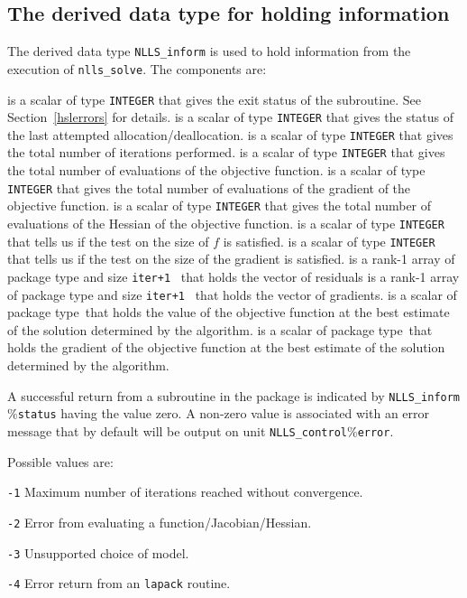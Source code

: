 \documentclass{spec}
\newcommand{\scalarinteger}{is a scalar of type {\tt INTEGER} }
\newcommand{\scalarreal}{is a scalar of package type\ }
\newcommand{\ronearrayreal}[1]{is a rank-1 array of package type and size {\tt #1}\ }
\begin{document}
\subsection{The derived data type for holding information}
\label{typeinform} 
The derived data type {\tt NLLS\_inform} is used
to hold information from the execution of {\tt nlls\_solve}.
The components are:
\begin{description}
       \scalarinteger that gives the exit status of the subroutine.  See Section~\ref{hslerrors} for details.
 \scalarinteger that gives the status of the last attempted allocation/deallocation.
 \scalarinteger that gives the total number of iterations performed.
 \scalarinteger that gives the total number of evaluations of the objective function.
 \scalarinteger that gives the total number of evaluations of the gradient of the objective function.
 \scalarinteger that gives the total number of evaluations of the Hessian of the objective function.
 \scalarinteger that tells us if the test on the size of \(f\) is satisfied.
 \scalarinteger that tells us if the test on the size of the gradient is satisfied.
 \ronearrayreal{iter+1} that holds the vector of residuals
 \ronearrayreal{iter+1} that holds the vector of gradients.
 \scalarreal that holds the value of the objective function at the best estimate of the solution determined by the algorithm.
 \scalarreal that holds the gradient of the objective function at the best estimate of the solution determined by the algorithm.
\end{description}


\hslerrors

A successful return from a subroutine in the package is indicated by 
{\tt NLLS\_inform$\%$status} having the value zero.  
A non-zero value is associated with an error message that by default will  
be output on unit {\tt NLLS\_control$\%$error}. 

Possible values are:
\begin{description}
\item{} {\tt -1} Maximum number of iterations reached without convergence.
\item{} {\tt -2} Error from evaluating a function/Jacobian/Hessian.
\item{} {\tt -3} Unsupported choice of model.
\item{} {\tt -4} Error return from an {\tt lapack} routine.
\end{description}
\end{document}
